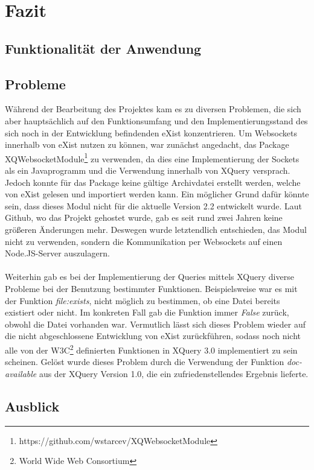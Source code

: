 \section{Fazit}
\label{sec:Fazit}
\subsection{Funktionalität der Anwendung}
\label{subsec:FunktionalitaetDerAnwendung}
\subsection{Probleme}
\label{subsec:Probleme}
Während der Bearbeitung des Projektes kam es zu diversen Problemen, die sich aber hauptsächlich auf den Funktionsumfang und den Implementierungsstand des sich noch in der Entwicklung befindenden eXist konzentrieren. Um Websockets innerhalb von eXist nutzen zu können, war zunächst angedacht, das Package XQWebsocketModule\footnote[1]{https://github.com/wstarcev/XQWebsocketModule} zu verwenden, da dies eine Implementierung der Sockets als ein Javaprogramm und die Verwendung innerhalb von XQuery versprach. Jedoch konnte für das Package keine gültige Archivdatei erstellt werden, welche von eXist gelesen und importiert werden kann. Ein möglicher Grund dafür könnte sein, dass dieses Modul nicht für die aktuelle Version 2.2 entwickelt wurde. Laut Github, wo das Projekt gehostet wurde, gab es seit rund zwei Jahren keine größeren Änderungen mehr. Deswegen wurde letztendlich entschieden, das Modul nicht zu verwenden, sondern die Kommunikation per Websockets auf einen Node.JS-Server auszulagern.
\\
\\
Weiterhin gab es bei der Implementierung der Queries mittels XQuery diverse Probleme bei der Benutzung bestimmter Funktionen. Beispielsweise war es mit der Funktion \textit{file:exists}, nicht möglich zu bestimmen, ob eine Datei bereits existiert oder nicht. Im konkreten Fall gab die Funktion immer \textit{False} zurück, obwohl die Datei vorhanden war. Vermutlich lässt sich dieses Problem wieder auf die nicht abgeschlossene Entwicklung von eXist zurückführen, sodass noch nicht alle von der W3C\footnote[2]{World Wide Web Consortium} definierten Funktionen in XQuery 3.0 implementiert zu sein scheinen. Gelöst wurde dieses Problem durch die Verwendung der Funktion \textit{doc-available} aus der XQuery Version 1.0, die ein zufriedenstellendes Ergebnis lieferte.

\subsection{Ausblick}
\label{subsec:Ausblick}